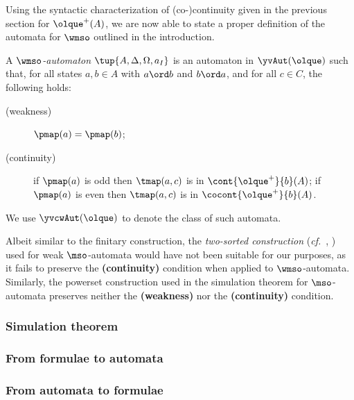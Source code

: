 Using the syntactic characterization of (co-)continuity given in the previous section for ${\olque}^+(A)$, we are now able to state a proper definition of the automata for $\wmso$ outlined in the introduction.
\begin{definition}
\label{d:wmso-aut}
A \emph{$\wmso$-automaton} $\tup{A,\Delta,\Omega,a_I}$ is an automaton in
$\yvAut(\olque)$ such that, for all states $a,b \in A$ with $a \ord b$ and
$b\ord a$, and for all $c \in C$, the following holds:
\begin{description}
\item[(weakness)] $\pmap(a)=\pmap(b)$;
\item[(continuity)]
  if $\pmap(a)$ is odd then $\tmap(a,c)$ is in $\cont{{\olque}^+}{b}(A)$;
  if $\pmap(a)$ is even then $\tmap(a,c)$ is in $\cocont{{\olque}^+}{b}(A)$.
\end{description}
We use $\yvcwAut(\olque)$ to denote the class of such automata.
\end{definition}



\begin{remark}{\rm
Albeit similar to the finitary construction, the \emph{two-sorted construction}
(\emph{cf.}~\cite[Def.~3.7]{Zanasi:Thesis:2012}, \cite{DBLP:conf/lics/FacchiniVZ13}) used for weak $\mso$-automata would have not been suitable for our purposes, as it fails to preserve the \textbf{(continuity)} condition when applied to $\wmso$-automata. Similarly, the powerset construction used in the simulation theorem for $\mso$-automata preserves neither the \textbf{(weakness)} nor the \textbf{(continuity)} condition.
}\end{remark} 



\subsubsection{Simulation theorem}


\subsubsection{From formulae to automata}


\subsubsection{From automata to formulae}
